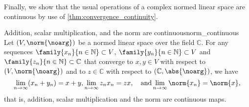 Finally, we show that the usual operations of a complex normed linear space are continuous by use of \cref{thm:convergence_continuity}.
\begin{proposition}{Addition, scalar multiplication, and the norm are continuous}{norm_continuous}
    Let \((V, \norm{\noarg})\) be a normed linear space over the field \(\mathbb{C}\). For any sequences \(\family{x_n}{n\in \mathbb{N}} \subset V\), \(\family{y_n}{n \in \mathbb{N}} \subset V\) and \(\family{z_n}{n \in \mathbb{N}} \subset \mathbb{C}\) that converge to \(x, y \in V\) with respect to \((V, \norm{\noarg})\) and to \(z \in \mathbb{C}\) with respect to \((\mathbb{C}, \abs{\noarg})\), we have
    \begin{equation*}
        \lim_{n\to \infty} (x_n + y_n) = x + y, \lim_{n \to \infty} z_n x_n = zx,\quad\text{and} \lim_{n \to \infty} \norm{x_n} = \norm{x},
    \end{equation*}
    that is, addition, scalar multiplication and the norm are continuous maps.
\end{proposition}
